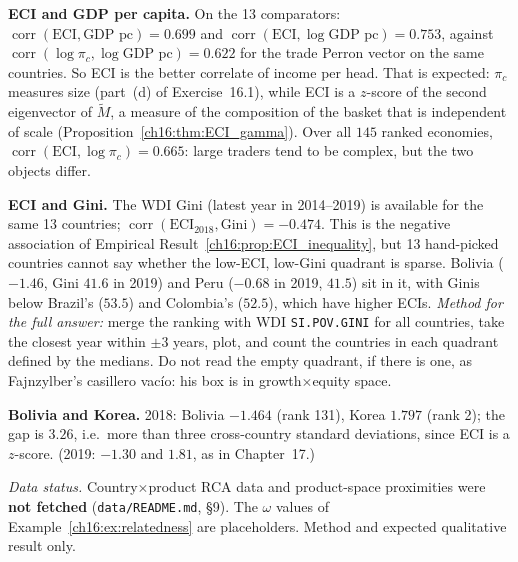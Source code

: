 \documentclass[../solutions_manual.tex]{subfiles}
\begin{document}
 \textbf{ECI and GDP per capita.} On the 13 comparators: $\operatorname{corr}(\text{ECI}, \text{GDP pc}) = 0.699$ and $\operatorname{corr}(\text{ECI}, \log\text{GDP pc}) = 0.753$, against $\operatorname{corr}(\log\pi_c, \log\text{GDP pc}) = 0.622$ for the trade Perron vector on the same countries. So ECI is the better correlate of income per head. That is expected: $\pi_c$ measures size (part~(d) of Exercise~16.1), while ECI is a $z$-score of the second eigenvector of $\tilde M$, a measure of the composition of the basket that is independent of scale (Proposition~\ref{ch16:thm:ECI_gamma}). Over all $145$ ranked economies, $\operatorname{corr}(\text{ECI}, \log\pi_c) = 0.665$: large traders tend to be complex, but the two objects differ.

 \textbf{ECI and Gini.} The WDI Gini (latest year in 2014--2019) is available for the same 13 countries; $\operatorname{corr}(\text{ECI}_{2018}, \text{Gini}) = -0.474$. This is the negative association of Empirical Result~\ref{ch16:prop:ECI_inequality}, but 13 hand-picked countries cannot say whether the low-ECI, low-Gini quadrant is sparse. Bolivia ($-1.46$, Gini $41.6$ in 2019) and Peru ($-0.68$ in 2019, $41.5$) sit in it, with Ginis below Brazil's ($53.5$) and Colombia's ($52.5$), which have higher ECIs. \emph{Method for the full answer:} merge the ranking with WDI \texttt{SI.POV.GINI} for all countries, take the closest year within $\pm 3$ years, plot, and count the countries in each quadrant defined by the medians. Do not read the empty quadrant, if there is one, as Fajnzylber's casillero vac\'{i}o: his box is in growth$\times$equity space.

 \textbf{Bolivia and Korea.} 2018: Bolivia $-1.464$ (rank 131), Korea $1.797$ (rank 2); the gap is $3.26$, i.e.\ more than three cross-country standard deviations, since ECI is a $z$-score. (2019: $-1.30$ and $1.81$, as in Chapter~17.)


\emph{Data status.} Country$\times$product RCA data and product-space proximities were \textbf{not fetched} (\nolinkurl{data/README.md}, \S9). The $\omega$ values of Example~\ref{ch16:ex:relatedness} are placeholders. Method and expected qualitative result only.
\end{document}
